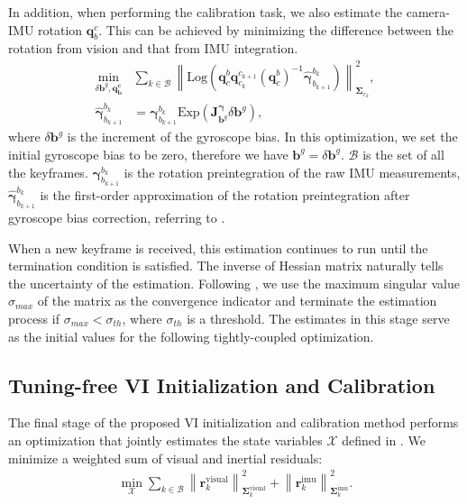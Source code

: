 In addition, when performing the calibration task, we also estimate the camera-IMU rotation $\mathbf{q}^c_b$. This can be achieved by minimizing the difference between the rotation from vision and that from IMU integration.
\begin{equation}
\begin{aligned}
    \min_{\delta \mathbf{b}^g, \mathbf{q^c_b}} & \sum_{k \in \mathcal{B}} \left\| \text{Log}(\mathbf{q}_c^b \mathbf{q}^{c_{k+1}}_{c_{k}} (\mathbf{q}^b_c)^{-1} \bm{\hat{\gamma}}_{b_{k+1}}^{b_k}) \right\|^2_{\bm{\Sigma}_{r_k}},
    \\
    \bm{\hat{\gamma}}_{b_{k+1}}^{b_k} &= \bm{\gamma}_{b_{k+1}}^{b_k} \text{Exp} \left( \mathbf{J}^{\bm{\gamma}}_{\mathbf{b}^g} \delta \mathbf{b}^g \right),
\end{aligned}
\end{equation}
where $\delta \mathbf{b}^g$ is the increment of the gyroscope bias. 
In this optimization, we set the initial gyroscope bias to be zero, therefore we have $\mathbf{b}^g=\delta \mathbf{b}^g$. $\mathcal{B}$ is the set of all the keyframes. $\boldsymbol{\gamma}_{b_{k+1}}^{b_k}$ is the rotation preintegration of the raw IMU measurements, $\hat{\boldsymbol{\gamma}}_{b_{k+1}}^{b_k}$ is the first-order approximation of the rotation preintegration after gyroscope bias correction, referring to \cite{forster_imu}. 

When a new keyframe is received, this estimation continues to run until the termination condition is satisfied. The inverse of Hessian matrix naturally tells the uncertainty of the estimation. Following \cite{shen-init}, we use the maximum singular value $\sigma_{max}$ of the matrix as the convergence indicator and terminate the estimation process if $\sigma_{max} < \sigma_{th}$, where $\sigma_{th}$ is a threshold. The estimates in this stage serve as the initial values for the following tightly-coupled optimization.


\subsection{Tuning-free VI Initialization and Calibration}
\label{sec:maci2:optimization}

The final stage of the proposed VI initialization and calibration method performs an optimization that jointly estimates the state variables $\mathcal {X}$ defined in . We minimize a weighted sum of visual and inertial residuals:
\begin{equation}
\label{eq:maci2:tight_optimize}
\begin{aligned}
    \min_{\mathcal {X}} \sum_{k \in \mathcal{B}} \left\| \mathbf{r}^{\text{visual}}_k \right\|^2_{\bm{\Sigma}^{\text{visual}}_k} + \left\| \mathbf{r}^{\text{imu}}_k \right\|^2_{\bm{\Sigma}^{\text{imu}}_k}.
\end{aligned}
\end{equation}

